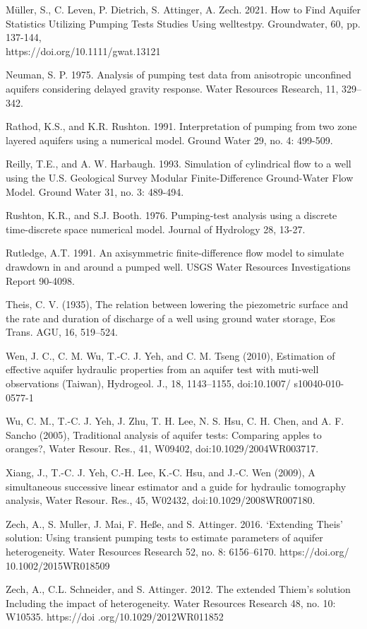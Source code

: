 \documentclass[11pt, a4paper]{article}
\begin{document}
    
    Müller, S., C. Leven, P. Dietrich, S. Attinger, A. Zech. 2021. How to Find Aquifer Statistics Utilizing Pumping Tests Studies Using welltestpy. Groundwater, 60, pp. 137-144, \\https://doi.org/10.1111/gwat.13121
    
    
    Neuman, S. P. 1975. Analysis of pumping test data from anisotropic unconfined aquifers considering delayed gravity response. Water Resources Research, 11, 329–342.
    
    
    Rathod, K.S., and K.R. Rushton. 1991. Interpretation of pumping from two zone layered aquifers using a numerical model. Ground Water 29, no. 4: 499-509. 

    
    Reilly, T.E., and A. W. Harbaugh. 1993. Simulation of cylindrical flow to a well using the U.S. Geological Survey Modular Finite-Difference Ground-Water Flow Model. Ground Water 31, no. 3: 489-494.

    
    Rushton, K.R., and S.J. Booth. 1976. Pumping-test analysis using a discrete time-discrete space numerical model. Journal of Hydrology 28, 13-27.

    
    Rutledge, A.T. 1991. An axisymmetric finite-difference flow model to simulate drawdown in and around a pumped well. USGS Water Resources Investigations Report 90-4098.
    
    
    Theis, C. V. (1935), The relation between lowering the piezometric surface and the rate and duration of discharge of a well using ground water storage, Eos Trans. AGU, 16, 519–524.
    
    
    Wen, J. C., C. M. Wu, T.-C. J. Yeh, and C. M. Tseng (2010), Estimation of effective aquifer hydraulic properties from an aquifer test with muti-well observations (Taiwan), Hydrogeol. J., 18, 1143–1155, doi:10.1007/ s10040-010-0577-1
    
    
    Wu, C. M., T.-C. J. Yeh, J. Zhu, T. H. Lee, N. S. Hsu, C. H. Chen, and A. F. Sancho (2005), Traditional analysis of aquifer tests: Comparing apples to oranges?, Water Resour. Res., 41, W09402, doi:10.1029/2004WR003717.
    
    
    Xiang, J., T.-C. J. Yeh, C.-H. Lee, K.-C. Hsu, and J.-C. Wen (2009), A simultaneous successive linear estimator and a guide for hydraulic tomography analysis, Water Resour. Res., 45, W02432, doi:10.1029/2008WR007180.

    
    Zech, A., S. Muller, J. Mai, F. Heße, and S. Attinger. 2016. `Extending Theis' solution: Using transient pumping tests to estimate parameters of aquifer heterogeneity. Water Resources Research 52, no. 8: 6156–6170. https://doi.org/ 10.1002/2015WR018509
    
    
    Zech, A., C.L. Schneider, and S. Attinger. 2012. The extended Thiem’s solution Including the impact of heterogeneity. Water Resources Research 48, no. 10: W10535. https://doi .org/10.1029/2012WR011852
    
    
\end{document}

